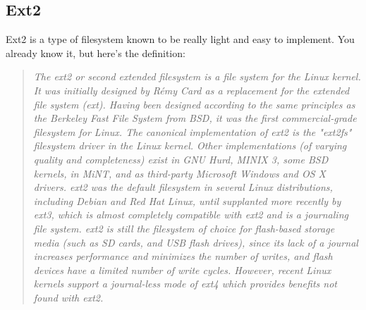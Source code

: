 \documentclass{42-en}
\begin{document}
    \subsection{Ext2}
    Ext2 is a type of filesystem known to be really light and easy to implement.
    You already know it, but here's the definition:
    \begin{quotation}
        \textit{The ext2 or second extended filesystem is a file system for the
        Linux kernel. It was initially designed by Rémy Card as a replacement
        for the extended file system (ext). Having been designed according to
        the same principles as the Berkeley Fast File System from BSD, it was
        the first commercial-grade filesystem for Linux.
        The canonical implementation of ext2 is the "ext2fs" filesystem driver
        in the Linux kernel. Other implementations (of varying quality and
        completeness) exist in GNU Hurd, MINIX 3, some BSD kernels, in MiNT,
        and as third-party Microsoft Windows and OS X drivers.
        ext2 was the default filesystem in several Linux distributions,
        including Debian and Red Hat Linux, until supplanted more recently by
        ext3, which is almost completely compatible with ext2 and is a
        journaling file system. ext2 is still the filesystem of choice for
        flash-based storage media (such as SD cards, and USB flash drives),
        since its lack of a journal increases performance and minimizes the
        number of writes, and flash devices have a limited number of write
        cycles. However, recent Linux kernels support a journal-less mode of
        ext4 which provides benefits not found with ext2.}
        \end{quotation}
    \newpage
\end{document}
